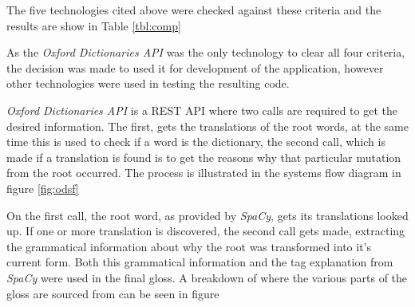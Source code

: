 The five technologies cited above were checked against these criteria and the results are show in Table \ref{tbl:comp}



As the \textit{Oxford Dictionaries API} was the only technology to clear all four criteria, the decision was made to used it for development of the application, however other technologies were used in testing the resulting code.

\textit{Oxford Dictionaries API} is a REST API where two calls are required to get the desired information. The first, gets the translations of the root words, at the same time this is used to check if a word is the dictionary, the second call, which is made if a translation is found is to get the reasons why that particular mutation from the root occurred.  The process is illustrated in the systems flow diagram in figure \ref{fig:odsf}



On the first call, the root word, as provided by \textit{SpaCy}, gets its translations looked up. If one or more translation is discovered, the second call gets made, extracting the grammatical information about why the root was transformed into it's current form. Both this grammatical information and the tag explanation from \textit{SpaCy} were used in the final gloss. A breakdown of where the various parts of the gloss are sourced from can be seen in figure 

